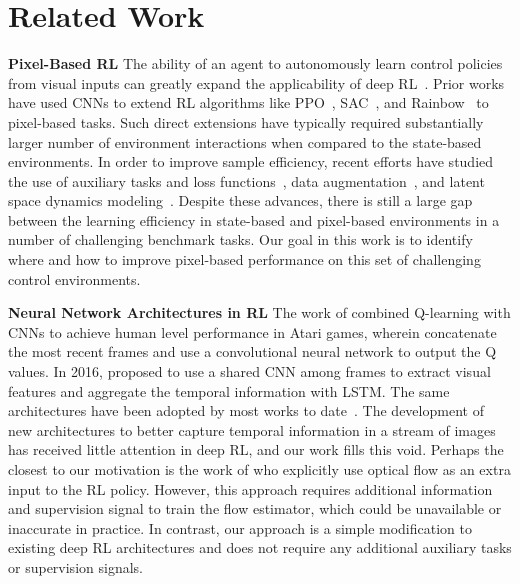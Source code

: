 \documentclass{article} \usepackage{iclr2021_conference,times}
\begin{document}
 \section{Related Work}
\textbf{Pixel-Based RL} The ability of an agent to autonomously learn control policies from visual inputs can greatly expand the applicability of deep RL~\citep{dosovitskiy2017carla, savva2019habitat}. Prior works have used CNNs to extend RL algorithms like PPO~\citep{ppo}, SAC~\citep{haarnoja2018soft}, and Rainbow~\citep{hessel2017rainbow} to pixel-based tasks. Such direct extensions have typically required substantially larger number of environment interactions when compared to the state-based environments. In order to improve sample efficiency, recent efforts have studied the use of auxiliary tasks and loss functions~\citep{yarats2019improving, laskin_srinivas2020curl, schwarzer2020data}, data augmentation~\citep{laskin_lee2020rad, kostrikov2020image}, and latent space dynamics modeling~\citep{hafner2019learning, hafner2019dream}. Despite these advances, there is still a large gap between the learning efficiency in state-based and pixel-based environments in a number of challenging benchmark tasks. Our goal in this work is to identify where and how to improve pixel-based performance on this set of challenging control environments. 

\textbf{Neural Network Architectures in RL} The work of \citet{mnih2015human} combined Q-learning with CNNs to achieve human level performance in Atari games, wherein \citet{mnih2015human} concatenate the most recent  frames and use a convolutional neural network to output the Q values. In 2016, \citet{mnih2016asynchronous} proposed to use a shared CNN among frames to extract visual features and aggregate the temporal information with LSTM. The same architectures have been adopted by most works to date~\citep{laskin_srinivas2020curl, schwarzer2020data,kostrikov2020image, laskin_lee2020rad}. 
The development of new architectures to better capture temporal information in a stream of images has received little attention in deep RL, and our work fills this void. Perhaps the closest to our motivation is the work of \citet{amiranashvili2018motion} who explicitly use optical flow as an extra input to the RL policy. However, this approach requires additional information and supervision signal to train the flow estimator, which could be unavailable or inaccurate in practice. In contrast, our approach is a simple modification to existing deep RL architectures and does not require any additional auxiliary tasks or supervision signals.
\end{document}
